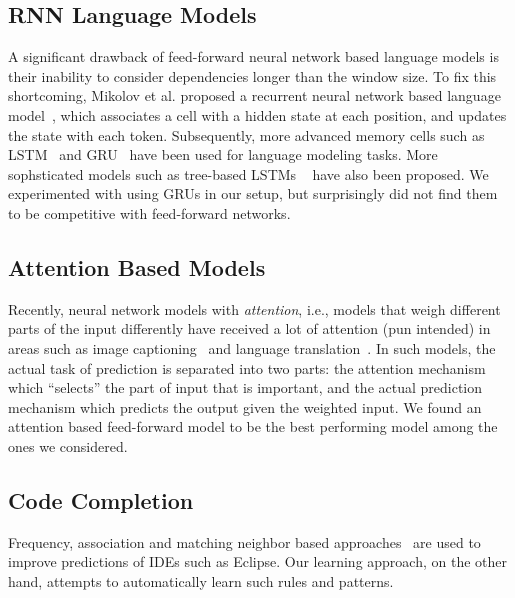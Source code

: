 \subsection{RNN Language Models}
\label{sec:rel:rnnlm}
A significant drawback of feed-forward neural network based language models is
their inability to consider dependencies longer than the window size. To fix
this shortcoming, Mikolov et al. proposed a recurrent neural network based
language model~\cite{ref:rnnlm}, which associates a cell with a hidden state
at each position, and updates the state with each token. Subsequently, more
advanced memory cells such as LSTM~\cite{ref:lstm} and GRU~\cite{ref:gru} have
been used for language modeling tasks. More sophsticated models such as
tree-based LSTMs ~\cite{ref:treelstm} have also
been proposed. We experimented with using GRUs in our setup, but surprisingly
did not find them to be competitive with feed-forward networks.

\subsection{Attention Based Models}
\label{sec:attn}
Recently, neural network models with {\it attention}, i.e., models that weigh
different parts of the input differently have received a lot of attention (pun
intended) in areas such as image captioning~\cite{ref:showattendtell} and
language translation~\cite{ref:nmt,ref:nmt2}. In such models, the actual task of
prediction is separated into two parts: the attention mechanism which
``selects'' the part of input that is important, and the actual prediction
mechanism which predicts the output given the weighted input. We found an
attention based feed-forward model to be the best performing model among the
ones we considered.

\subsection{Code Completion}
\label{sec:code-completion}
Frequency, association and matching neighbor based
approaches~\cite{ref:learningexamples} are used to improve predictions of IDEs such
as Eclipse.
Our learning approach, on the other hand, attempts to automatically
learn such rules and patterns.
